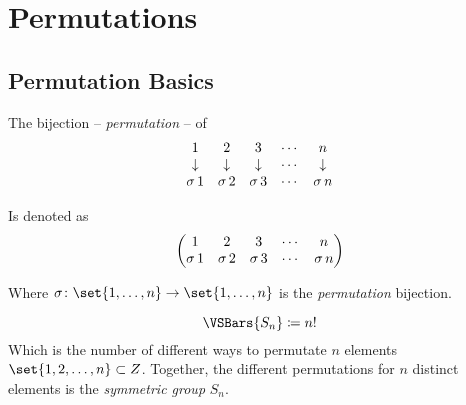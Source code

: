 \chapter{Permutations}

\section{Permutation Basics}

\begin{definition}[Permutation]
    The bijection -- \textit{permutation} -- of
    \begin{equation}
        \begin{matrix}
            1 &2 &3 &\cdots &n \\
            \downarrow &\downarrow &\downarrow &\cdots &\downarrow \\
            \operatorname{\sigma}{1} &\operatorname{\sigma}{2} &\operatorname{\sigma}{3} &\cdots &\operatorname{\sigma}{n}
        \end{matrix}
    \end{equation}
    
    Is denoted as
    \begin{equation}
        \begin{pmatrix}
            1 &2 &3 &\cdots &n \\
            \operatorname{\sigma}{1} &\operatorname{\sigma}{2} &\operatorname{\sigma}{3} &\cdots &\operatorname{\sigma}{n}
        \end{pmatrix}
    \end{equation}
    
    Where $\sigma \colon \set{1, \dots, n} \to \set{1, \dots, n}$ is the \textit{permutation} bijection.
\end{definition}

\begin{definition}
    \begin{equation}
        \VSBars{S_n} \coloneqq n!
    \end{equation}
    Which is the number of different ways to permutate $n$ elements $\set{1, 2, \dots, n} \subset \Int$. Together, the different permutations for $n$ distinct elements is the \textit{symmetric group} $S_n$.
\end{definition}


